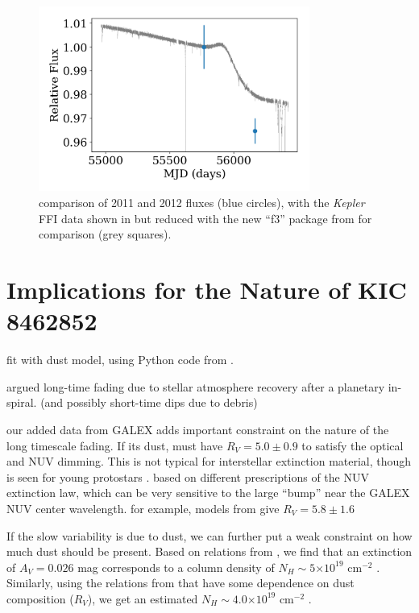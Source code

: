 \documentclass[twocolumn]{aastex6}
\providecommand{\e}[1]{\ensuremath{\times 10^{#1}}}
\newcommand{\Kepler}{\textsl{Kepler}\xspace}
\begin{document}
\begin{figure}[]
\centering
\includegraphics[width=3.5in]{KIC8462852_compare}
\caption{comparison of 2011 and 2012 fluxes (blue circles), with the \Kepler FFI data shown in \citet{montet2016} but reduced with the new ``f3'' package from \citet{montet2017} for comparison (grey squares).}
\label{fig:longtime}
\end{figure}





\section{Implications for the Nature of KIC 8462852}


fit with \citet{cardelli1989} dust model, using Python code from \citet{barbary2016}.



\citet{metzger2017} argued long-time fading due to stellar atmosphere recovery after a planetary in-spiral. (and possibly short-time dips due to debris) 

our added data from GALEX adds important constraint on the nature of the long timescale fading. If its dust, must have $R_V=5.0\pm0.9$ to satisfy the optical and NUV dimming. This is not typical for interstellar extinction material, though is seen for young protostars \citep[e.g.][]{hecht1982}. based on different prescriptions of the NUV extinction law, which can be very sensitive to the large ``bump'' near the GALEX NUV center wavelength.  
for example, models from \citet{fitzpatrick2009}give $R_V=5.8\pm1.6$


If the slow variability is due to dust, we can further put a weak constraint on how much dust should be present. Based on relations from \citep{guver2009}, we find that an extinction of $A_V = 0.026$ mag corresponds to 
a column density of $N_H\sim5\e{19}$ cm$^{-2}$ . Similarly, using the relations from \citet{rachford2002} that have some dependence on dust composition ($R_V$), we get an estimated $N_H\sim4.0\e{19}$ cm$^{-2}$ .
\end{document}
